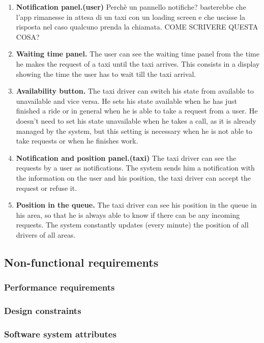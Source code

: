 \documentclass[18pt,oneside,a4paper, titlepage]{article}
\begin{document}
\begin{enumerate}
			\item \textbf{Notification panel.(user)}
				Perchè un pannello notifiche? basterebbe che l'app rimanesse in attesa di un taxi con un loading screen e che uscisse la risposta nel caso qualcuno prenda la chiamata. COME SCRIVERE QUESTA COSA?
			\item \textbf{Waiting time panel.}
				The user can see the waiting time panel from the time he makes the request of a taxi until the taxi arrives. This consists in a display showing the time the user has to wait till the taxi arrival.
				
			\item \textbf{Availability button.}
				The taxi driver can switch his state from available to unavailable and vice versa. He sets his state available when he has just finished a ride or in general when he is able to take a request from a user. He doesn't need to set his state unavailable when he takes a call, as it is already managed by the system, but this setting is necessary when he is not able to take requests or when he finishes work.
			\item \textbf{Notification and position panel.(taxi)}
				The taxi driver can see the requests by a user as notifications. The system sends him a notification with the information on the user and his position, the taxi driver can accept the request or refuse it.
			\item \textbf{Position in the queue.}
				The taxi driver can see his position in the queue in his area, so that he is always able to know if there can be any incoming requests. The system constantly updates (every minute) the position of all drivers of all areas.
			
			
		\end{enumerate}
	\subsection{Non-functional requirements}
		\subsubsection{Performance requirements}
		\subsubsection{Design constraints}
		\subsubsection{Software system attributes}
\end{document}
